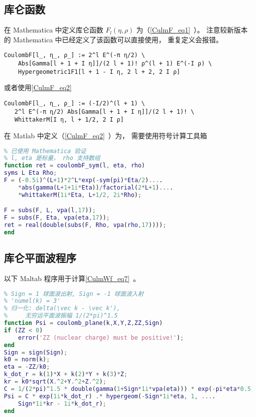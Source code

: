 


\subsection{库仑函数}
在 Mathematica 中定义库仑函数 $F_l(\eta, \rho)$ 为（\autoref{CulmF_eq1}~）。 注意较新版本的 Mathematica 中已经定义了该函数可以直接使用， 重复定义会报错。
\begin{lstlisting}[language=mma] % 已验证
CoulombF[l_, η_, ρ_] := 2^l E^(-π η/2) \
    Abs[Gamma[l + 1 + I η]]/(2 l + 1)! ρ^(l + 1) E^(-I ρ) \
    Hypergeometric1F1[l + 1 - I η, 2 l + 2, 2 I ρ]
\end{lstlisting}
或者使用\autoref{CulmF_eq2}~\upref{CulmF} %
\begin{lstlisting}[language=mma]
CoulombF[l_, η_, ρ_] := (-I/2)^(l + 1) \
   2^l E^(-π η/2) Abs[Gamma[l + 1 + I η]]/(2 l + 1)! \
   WhittakerM[I η, l + 1/2, 2 I ρ]
\end{lstlisting}

在 Matlab 中定义（\autoref{CulmF_eq2}~\upref{CulmF}）为， 需要使用符号计算工具箱 %
\begin{lstlisting}[language=matlab, caption=coulombF\_sym.m]
% 第一类库仑函数 F_l(eta, rho)
% 已使用 Mathematica 验证
% l, eta 是标量， rho 支持数组
function ret = coulombF_sym(l, eta, rho)
syms L Eta Rho;
F = (-0.5i)^(L+1)*2^L*exp(-sym(pi)*Eta/2)....
    *abs(gamma(L+1+1i*Eta))/factorial(2*L+1)....
    *whittakerM(1i*Eta, L+1/2, 2i*Rho);

F = subs(F, L, vpa(l,17));
F = subs(F, Eta, vpa(eta,17));
ret = real(double(subs(F, Rho, vpa(rho,17))));
end
\end{lstlisting}

\subsection{库仑平面波程序}
以下 Maltab 程序用于计算\autoref{CulmWf_eq7}~。
\begin{lstlisting}[language=matlab, caption=coulomb\_plane.m]
% 直角坐标系的库仑平面波
% Sign = 1 球面波出射, Sign = -1 球面波入射
% 'numel(k) = 3'
% 归一化: delta(\vec k - \vec k'),
%     无穷远平面波振幅 1/(2*pi)^1.5
function Psi = coulomb_plane(k,X,Y,Z,ZZ,Sign)
if (ZZ < 0)
    error('ZZ (nuclear charge) must be positive!');
end
Sign = sign(Sign);
k0 = norm(k);
eta = -ZZ/k0;
k_dot_r = k(1)*X + k(2)*Y + k(3)*Z;
kr = k0*sqrt(X.^2+Y.^2+Z.^2);
C = 1/(2*pi)^1.5 * double(gamma(1+Sign*1i*vpa(eta))) * exp(-pi*eta*0.5);
Psi = C * exp(1i*k_dot_r) .* hypergeom(-Sign*1i*eta, 1, ....
    Sign*1i*kr - 1i*k_dot_r);
end
\end{lstlisting}

